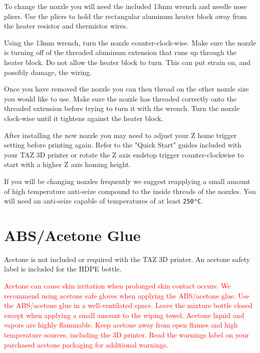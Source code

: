 To change the nozzle you will need the included 13mm wrench and needle nose pliers. Use the pliers to hold the rectangular aluminum heater block away from the heater resistor and thermistor wires.

Using the 13mm wrench, turn the nozzle counter-clock-wise. Make sure the nozzle is turning off of the threaded aluminum extension that runs up through the heater block. Do not allow the heater block to turn. This can put strain on, and possibly damage, the wiring.

Once you have removed the nozzle you can then thread on the other nozzle size you would like to use. Make sure the nozzle has threaded correctly onto the threaded extension before trying to turn it with the wrench. Turn the nozzle clock-wise until it tightens against the heater block.

After installing the new nozzle you may need to adjust your Z home trigger setting before printing again. Refer to the "Quick Start" guides included with your TAZ 3D printer or rotate the Z axis endstop trigger counter-clockwise to start with a higher Z axis homing height.

If you will be changing nozzles frequently we suggest reapplying a small amount of high temperature anti-seize compound to the inside threads of the nozzles. You will need an anti-seize capable of temperatures of at least \texttt{250°C}.

\section{ABS/Acetone Glue}
\label{sec:ABS/Acetone Glue}
Acetone is not included or required with the TAZ 3D printer. An acetone safety label is included for the HDPE bottle.

\textcolor{red}{Acetone can cause skin irritation when prolonged skin contact occurs. We recommend using acetone safe gloves when applying the ABS/acetone glue. Use the ABS/acetone glue in a well-ventilated space. Leave the mixture bottle closed except when applying a small amount to the wiping towel. Acetone liquid and vapors are highly flammable. Keep acetone away from open flames and high temperature sources, including the 3D printer. Read the warnings label on your purchased acetone packaging for additional warnings.}

